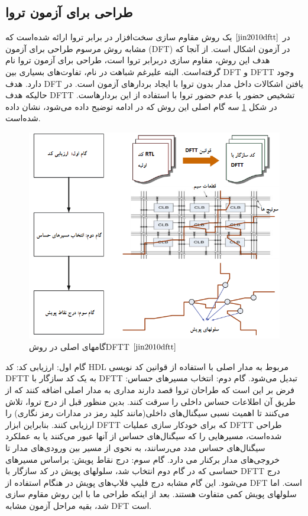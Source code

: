 \subsection {طراحی برای آزمون تروا}
در $\cite{jin2010dftt}$ یک روش مقاوم سازی سخت‌افزار در برابر تروا ارائه شده‌است که مشابه روش مرسوم طراحی برای آزمون (DFT) در آزمون اشکال است. از آنجا که هدف این روش، مقاوم سازی دربرابر تروا است، طراحی برای آزمون تروا نام گرفته‌است. البته علیرغم شباهت در نام، تفاوت‌های بسیاری بین DFT و DFTT وجود دارد. هدف DFT یافتن اشکالات داخل مدار بدون تروا با ایجاد بردارهای آزمون است. در حالیکه هدف DFTT تشخیص حضور یا عدم حضور تروا با استفاده از این بردارهاست. در شکل \ref{fig7-5} سه گام اصلی این روش که در ادامه توضیح داده می‌شود، نشان داده شده‌است.
\begin{figure}
	\begin{center}
		\includegraphics[scale=1]{figs/fig7-5.png}
		\caption[گامهای اصلی در روشDFTT]
		{گامهای اصلی در روشDFTT $\cite{jin2010dftt}$}
		\label{fig7-5}
	\end{center}
\end{figure} 
گام اول: ارزیابی کد:
کد HDL مربوط به مدار اصلی با استفاده از قوانین کد نویسی DFTT به یک کد سازگار با DFTT تبدیل می‌شود.
گام دوم: انتخاب مسیرهای حساس:
فرض بر این است که طراحان تروا قصد دارند مداری به مدار اصلی اضافه کنند که از طریق آن اطلاعات حساس داخلی را سرقت کنند. بدین منظور قبل از درج تروا، تلاش می‌کنند تا اهمیت نسبی سیگنال‌های داخلی(مانند کلید رمز در مدارات رمز نگاری) را ارزیابی کنند. بنابراین ابزار DFTT که برای خودکار سازی عملیات DFTT طراحی شده‌است، مسیرهایی را که سیگنال‌های حساس از آنها عبور می‌کنند یا به عملکرد سیگنال‌های حساس مدد می‌رسانند، به نحوی از مسیر بین ورودی‌های مدار تا خروجی‌های مدار برکنار می دارد.
گام سوم: درج نقاط پویش:
براساس مسیرهای حساسی که در گام دوم انتخاب شد، سلولهای پویش در کد سازگار با DFTT درج می‌شود. این گام مشابه درج فلیپ فلاپ‌های پویش در هنگام استفاده از DFT است. اما سلولهای پویش کمی متفاوت هستند. 
بعد از اینکه طراحی ما با این روش مقاوم سازی شد، بقیه مراحل آزمون مشابه DFT است.
